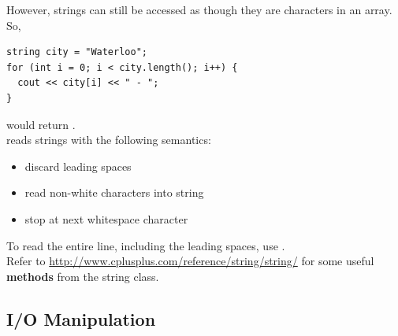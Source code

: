 \documentclass[english, 11pt]{article}
\begin{document}
However, strings can still be accessed as though they are characters in an array. So,
\begin{lstlisting}
string city = "Waterloo";
for (int i = 0; i < city.length(); i++) {
  cout << city[i] << " - ";
}
\end{lstlisting}
would return . \\

 reads strings with the following semantics:
\begin{itemize}
  \item discard leading spaces
  \item read non-white characters into string
  \item stop at next whitespace character
\end{itemize}
To read the entire line, including the leading spaces, use . \\

Refer to \url{http://www.cplusplus.com/reference/string/string/} for some useful \textbf{methods} from the string class.

\subsection{I/O Manipulation}
\end{document}
